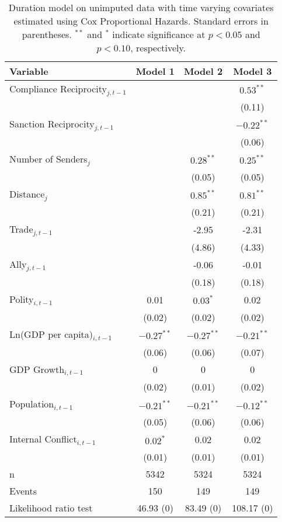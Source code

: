 \begin{table}[ht]
\centering
{\normalsize
\begin{tabular}{lccc}
 Variable & Model 1 & Model 2 & Model 3 \\ 
  \hline
\hline
Compliance Reciprocity$_{j,t-1}$ &  &  & $0.53^{\ast\ast}$ \\ 
   &  &  & (0.11) \\ 
  Sanction Reciprocity$_{j,t-1}$ &  &  & $-0.22^{\ast\ast}$ \\ 
   &  &  & (0.06) \\ 
   \hline
Number of Senders$_{j}$ &  & $0.28^{\ast\ast}$ & $0.25^{\ast\ast}$ \\ 
   &  & (0.05) & (0.05) \\ 
  Distance$_{j}$ &  & $0.85^{\ast\ast}$ & $0.81^{\ast\ast}$ \\ 
   &  & (0.21) & (0.21) \\ 
  Trade$_{j,t-1}$ &  & -2.95 & -2.31 \\ 
   &  & (4.86) & (4.33) \\ 
  Ally$_{j,t-1}$ &  & -0.06 & -0.01 \\ 
   &  & (0.18) & (0.18) \\ 
   \hline
Polity$_{i,t-1}$ & 0.01 & $0.03^{\ast}$ & 0.02 \\ 
   & (0.02) & (0.02) & (0.02) \\ 
  Ln(GDP per capita)$_{i,t-1}$ & $-0.27^{\ast\ast}$ & $-0.27^{\ast\ast}$ & $-0.21^{\ast\ast}$ \\ 
   & (0.06) & (0.06) & (0.07) \\ 
  GDP Growth$_{i,t-1}$ & 0 & 0 & 0 \\ 
   & (0.02) & (0.01) & (0.02) \\ 
  Population$_{i,t-1}$ & $-0.21^{\ast\ast}$ & $-0.21^{\ast\ast}$ & $-0.12^{\ast\ast}$ \\ 
   & (0.05) & (0.06) & (0.06) \\ 
  Internal Conflict$_{i,t-1}$ & $0.02^{\ast}$ & 0.02 & 0.02 \\ 
   & (0.01) & (0.01) & (0.01) \\ 
   \hline
n & 5342 & 5324 & 5324 \\ 
  Events & 150 & 149 & 149 \\ 
  Likelihood ratio test & 46.93 (0) & 83.49 (0) & 108.17 (0) \\ 
   \hline
\hline
\end{tabular}
}
\caption{Duration model on unimputed data with time varying covariates estimated using Cox Proportional Hazards. Standard errors in parentheses. $^{**}$ and $^{*}$ indicate significance at $p< 0.05 $ and $p< 0.10 $, respectively.} 
\label{tab:regResultsNoImp}
\end{table}
